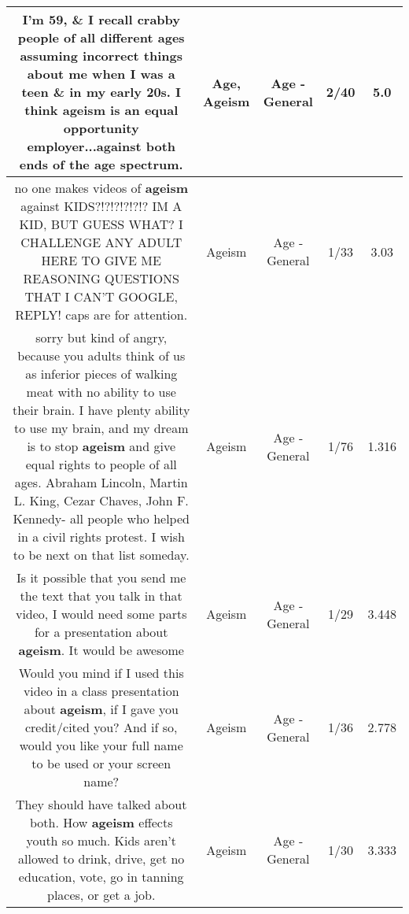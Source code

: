 \documentclass[11pt]{article}
\newlength\mylength
\begin{document}
\begin{center}
\begin{longtable}{|C{.65\mylength}|C{.30\mylength}|C{.12\mylength}|C{.12\mylength}|C{.12\mylength}|}
  \small I'm 59, \& I recall crabby people of all different ages assuming incorrect things about me when I was a teen \& in my early 20s.  I think \textbf{ageism} is an equal opportunity employer...against both ends of the \textbf{age} spectrum.\normalsize   & Age, Ageism & Age - General & 2/40 & 5.0 \\  \hline
  \small no one makes videos of \textbf{ageism} against KIDS?!?!?!?!?!? IM A KID, BUT GUESS WHAT? I CHALLENGE ANY ADULT HERE TO GIVE ME REASONING QUESTIONS THAT I CAN'T GOOGLE, REPLY! caps are for attention.\normalsize   & Ageism & Age - General & 1/33 & 3.03 \\  \hline
  \small sorry but kind of angry, because you adults think of us as inferior pieces of walking meat with no ability to use their brain. I have plenty ability to use my brain, and my dream is to stop \textbf{ageism} and give equal rights to people of all ages. Abraham Lincoln, Martin L. King, Cezar Chaves, John F. Kennedy- all people who helped in a civil rights protest. I wish to be next on that list someday.\normalsize   & Ageism & Age - General & 1/76 & 1.316 \\  \hline
  \small Is it possible that you send me the text that you talk in that video, I would need some parts for a presentation about \textbf{ageism}. It would be awesome\normalsize   & Ageism & Age - General & 1/29 & 3.448 \\  \hline
  \small Would you mind if I used this video in a class presentation about \textbf{ageism}, if I gave you credit/cited you?  And if so, would you like your full name to be used or your screen name?\normalsize   & Ageism & Age - General & 1/36 & 2.778 \\  \hline
  \small They should have talked about both. How \textbf{ageism} effects youth so much. Kids aren't allowed to drink, drive, get no education, vote, go in tanning places, or get a job.\normalsize   & Ageism & Age - General & 1/30 & 3.333 \\  \hline

\end{longtable}
\end{center}
\end{document}
